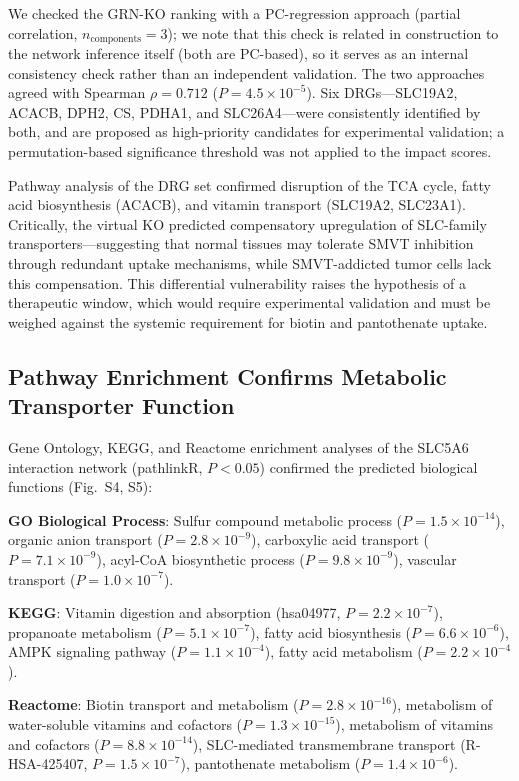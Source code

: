 \documentclass[10pt,letterpaper]{article}
\begin{document}
We checked the GRN-KO ranking with a PC-regression approach (partial correlation, $n_{\text{components}}=3$); we note that this check is related in construction to the network inference itself (both are PC-based), so it serves as an internal consistency check rather than an independent validation. The two approaches agreed with Spearman $\rho = 0.712$ ($P = 4.5\times10^{-5}$). Six DRGs---SLC19A2, ACACB, DPH2, CS, PDHA1, and SLC26A4---were consistently identified by both, and are proposed as high-priority candidates for experimental validation; a permutation-based significance threshold was not applied to the impact scores.

Pathway analysis of the DRG set confirmed disruption of the TCA cycle, fatty acid biosynthesis (ACACB), and vitamin transport (SLC19A2, SLC23A1). Critically, the virtual KO predicted compensatory upregulation of SLC-family transporters---suggesting that normal tissues may tolerate SMVT inhibition through redundant uptake mechanisms, while SMVT-addicted tumor cells lack this compensation. This differential vulnerability raises the hypothesis of a therapeutic window, which would require experimental validation and must be weighed against the systemic requirement for biotin and pantothenate uptake.

\subsection*{Pathway Enrichment Confirms Metabolic Transporter Function}

Gene Ontology, KEGG, and Reactome enrichment analyses of the SLC5A6 interaction network (pathlinkR, $P < 0.05$) confirmed the predicted biological functions (Fig.~S4, S5):

\noindent\textbf{GO Biological Process}: Sulfur compound metabolic process ($P=1.5\times10^{-14}$), organic anion transport ($P=2.8\times10^{-9}$), carboxylic acid transport ($P=7.1\times10^{-9}$), acyl-CoA biosynthetic process ($P=9.8\times10^{-9}$), vascular transport ($P=1.0\times10^{-7}$).

\noindent\textbf{KEGG}: Vitamin digestion and absorption (hsa04977, $P=2.2\times10^{-7}$), propanoate metabolism ($P=5.1\times10^{-7}$), fatty acid biosynthesis ($P=6.6\times10^{-6}$), AMPK signaling pathway ($P=1.1\times10^{-4}$), fatty acid metabolism ($P=2.2\times10^{-4}$).

\noindent\textbf{Reactome}: Biotin transport and metabolism ($P=2.8\times10^{-16}$), metabolism of water-soluble vitamins and cofactors ($P=1.3\times10^{-15}$), metabolism of vitamins and cofactors ($P=8.8\times10^{-14}$), SLC-mediated transmembrane transport (R-HSA-425407, $P=1.5\times10^{-7}$), pantothenate metabolism ($P=1.4\times10^{-6}$).
\end{document}
